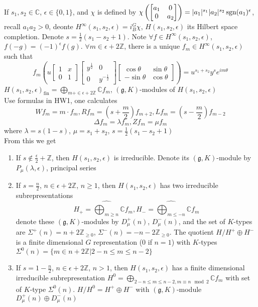 \documentclass[main]{subfiles}
\begin{document}
If $s_1,s_2\in\mathbb C$, $\epsilon\in\{0,1\}$, and $\chi$ is defined by $\chi\left(\begin{bmatrix}
a_1&0\\
0&a_2
\end{bmatrix}\right)=|a_1|^{s_1}|a_2|^{s_2}\operatorname{sgn}(a_1)^\epsilon$, recall $a_1a_2>0$, deonte $H^\infty(s_1,s_2,\epsilon)=i^G_B\chi$, $H(s_1,s_2,\epsilon)$ its Hilbert space completion. Denote $s=\frac{1}{2}(s_1-s_2+1)$. Note $\forall f\in H^\infty(s_1,s_2,\epsilon)$, $f(-g)=(-1)^\epsilon f(g)$. $\forall m\in\epsilon+2\mathbb Z$, there is a unique $f_m\in H^\infty(s_1,s_2,\epsilon)$ such that
\[f_m\left(u\begin{bmatrix}
1&x\\
0&1
\end{bmatrix}\begin{bmatrix}
y^{\frac{1}{2}}&0\\
0&y^{-\frac{1}{2}}
\end{bmatrix}\begin{bmatrix}
\cos\theta&\sin\theta\\
-\sin\theta&\cos\theta
\end{bmatrix}\right)=u^{s_1+s_2}y^se^{im\theta}\]
$H(s_1,s_2,\epsilon)_{\mathrm{fin}}=\bigoplus_{m+\in\epsilon+2\mathbb Z}\mathbb Cf_m$, $(\mathfrak g,K)$-modules of $H(s_1,s_2,\epsilon)$ \\
Use formulas in HW1, one calculates
\[Wf_m=m\cdot f_m,Rf_m=(s+\frac{m}{2})f_{m+2},Lf_m=(s-\frac{m}{2})f_{m-2}\]
\[\Delta f_m=\lambda f_m,Zf_m=\mu f_m\]
where $\lambda=s(1-s)$, $\mu=s_1+s_2$, $s=\frac{1}{2}(s_1-s_2+1)$ \\
From this we get
\begin{enumerate}
\item If $s\notin\frac{\epsilon}{2}+\mathbb Z$, then $H(s_1,s_2,\epsilon)$ is irreducible. Denote its $(\mathfrak g,K)$-module by $P_\mu(\lambda,\epsilon)$, principal series
\item If $s=\frac{n}{2}$, $n\in\epsilon+2\mathbb Z$, $n\geq1$, then $H(s_1,s_2,\epsilon)$ has two irreducible subrepresentations \[H_+=\widehat{\bigoplus_{m\geq n}}\mathbb Cf_m,H_-=\widehat{\bigoplus_{m\leq-n}}\mathbb Cf_m\] denote these $(\mathfrak g,K)$-modules by $D^+_\mu(n)$, $D^-_\mu(n)$, and the set of $K$-types are $\Sigma^+(n)=n+2\mathbb Z_{\geq0}$, $\Sigma^-(n)=-n-2\mathbb Z_{\geq0}$. The quotient $H/H^+\oplus H^-$ is a finite dimensional $G$ representation (0 if $n=1$) with $K$-types $\Sigma^0(n)=\{m\in n+2\mathbb Z|2-n\leq m\leq n-2\}$
\item If $s=1-\frac{n}{2}$, $n\in\epsilon+2\mathbb Z$, $n>1$, then $H(s_1,s_2,\epsilon)$ has a finite dimensional irreducible subrepresentation $H^0=\bigoplus_{2-n\leq m\leq n-2,m\equiv n\mod 2}\mathbb Cf_m$ with set of $K$-type $\Sigma^0(n)$. $H/H^0=H^+\oplus H^-$ with $(\mathfrak g,K)$-module $D^+_\mu(n)\oplus D^-_\mu(n)$
\end{enumerate}
\end{document}
